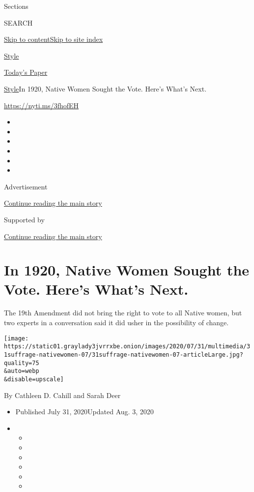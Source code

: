 Sections

SEARCH

\protect\hyperlink{site-content}{Skip to
content}\protect\hyperlink{site-index}{Skip to site index}

\href{https://www.nytimes3xbfgragh.onion/section/style}{Style}

\href{https://myaccount.nytimes3xbfgragh.onion/auth/login?response_type=cookie\&client_id=vi}{}

\href{https://www.nytimes3xbfgragh.onion/section/todayspaper}{Today's
Paper}

\href{/section/style}{Style}\textbar{}In 1920, Native Women Sought the
Vote. Here's What's Next.

\url{https://nyti.ms/3fhofEH}

\begin{itemize}
\item
\item
\item
\item
\item
\item
\end{itemize}

Advertisement

\protect\hyperlink{after-top}{Continue reading the main story}

Supported by

\protect\hyperlink{after-sponsor}{Continue reading the main story}

\hypertarget{in-1920-native-women-sought-the-vote-heres-whats-next}{%
\section{In 1920, Native Women Sought the Vote. Here's What's
Next.}\label{in-1920-native-women-sought-the-vote-heres-whats-next}}

The 19th Amendment did not bring the right to vote to all Native women,
but two experts in a conversation said it did usher in the possibility
of change.

\texttt{[image: https://static01.graylady3jvrrxbe.onion/images/2020/07/31/multimedia/31suffrage-nativewomen-07/31suffrage-nativewomen-07-articleLarge.jpg?quality=75\\\&auto=webp\\\&disable=upscale]}

By Cathleen D. Cahill and Sarah Deer

\begin{itemize}
\item
  Published July 31, 2020Updated Aug. 3, 2020
\item
  \begin{itemize}
  \item
  \item
  \item
  \item
  \item
  \item
  \end{itemize}
\end{itemize}

